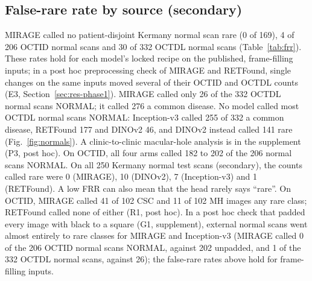 \documentclass[conference]{IEEEtran}
\begin{document}
\subsection{False-rare rate by source (secondary)}
\label{sec:res-frr}
MIRAGE called no patient-disjoint Kermany normal scan rare (0 of 169), 4 of 206 OCTID normal scans and 30 of 332 OCTDL normal scans (Table~\ref{tab:frr}). These rates hold for each model's locked recipe on the published, frame-filling inputs; in a post hoc preprocessing check of MIRAGE and RETFound, single changes on the same inputs moved several of their OCTID and OCTDL counts (E3, Section~\ref{sec:res-phase1}).
MIRAGE called only 26 of the 332 OCTDL normal scans NORMAL; it called 276 a common disease. No model called most OCTDL normal scans NORMAL: Inception-v3 called 255 of 332 a common disease, RETFound 177 and DINOv2 46, and DINOv2 instead called 141 rare (Fig.~\ref{fig:normals}). A clinic-to-clinic macular-hole analysis is in the supplement (P3, post hoc).
On OCTID, all four arms called 182 to 202 of the 206 normal scans NORMAL. On all 250 Kermany normal test scans (secondary), the counts called rare were 0 (MIRAGE), 10 (DINOv2), 7 (Inception-v3) and 1 (RETFound).
A low FRR can also mean that the head rarely says ``rare''. On OCTID, MIRAGE called 41 of 102 CSC and 11 of 102 MH images any rare class; RETFound called none of either (R1, post hoc).
In a post hoc check that padded every image with black to a square (G1, supplement), external normal scans went almost entirely to rare classes for MIRAGE and Inception-v3 (MIRAGE called 0 of the 206 OCTID normal scans NORMAL, against 202 unpadded, and 1 of the 332 OCTDL normal scans, against 26); the false-rare rates above hold for frame-filling inputs.
\end{document}
